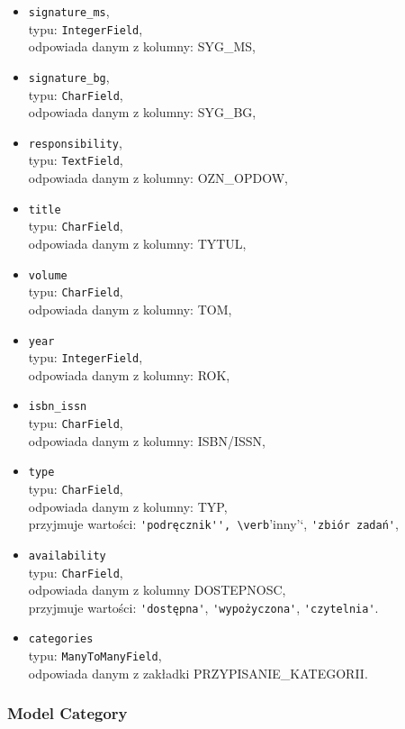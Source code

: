 \documentclass[twoside]{projektInzynierskiMS}
\begin{document}
\begin{itemize}
	\item \verb`signature_ms`, \\
		typu: \verb`IntegerField`, \\
		odpowiada danym z kolumny: SYG\_MS,
	\item \verb`signature_bg`, \\
		typu: \verb`CharField`, \\
		odpowiada danym z kolumny: SYG\_BG,
	\item \verb`responsibility`, \\
		typu: \verb`TextField`, \\
		odpowiada danym z kolumny: OZN\_OPDOW,
	\item \verb`title` \\
		typu: \verb`CharField`, \\
		odpowiada danym z kolumny: TYTUL,
	\item \verb`volume` \\
		typu: \verb`CharField`, \\
		odpowiada danym z kolumny: TOM,
	\item \verb`year`\\
		typu: \verb`IntegerField`, \\
		odpowiada danym z kolumny: ROK,
	\item \verb`isbn_issn` \\
		typu: \verb`CharField`, \\
		odpowiada danym z kolumny: ISBN/ISSN,
	\item \verb`type` \\
		typu: \verb`CharField`, \\
		odpowiada danym z kolumny: TYP, \\
		przyjmuje wartości: \verb`'podręcznik'', \verb`'inny'`, \verb`'zbiór zadań'`,
	\item \verb`availability` \\
		typu: \verb`CharField`, \\
		odpowiada danym z kolumny DOSTEPNOSC, \\
		przyjmuje wartości: \verb`'dostępna'`, \verb`'wypożyczona'`, \verb`'czytelnia'`.
	\item \verb`categories` \\
		typu: \verb`ManyToManyField`, \\
		odpowiada danym z zakładki PRZYPISANIE\_KATEGORII.
\end{itemize}

\subsubsection{Model Category}
\end{document}
